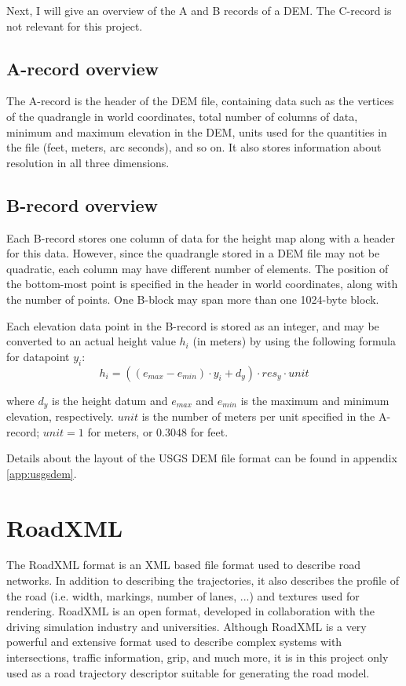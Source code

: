 Next, I will give an overview of the A and B records of a DEM. The C-record is not relevant for this project.

\subsection{A-record overview}
The A-record is the header of the DEM file, containing data such as the vertices of the quadrangle in world coordinates, total number of columns of data, minimum and maximum elevation in the DEM, units used for the quantities in the file (feet, meters, arc seconds), and so on. It also stores information about resolution in all three dimensions. 

\subsection{B-record overview}
\label{sec:back_brecord}
Each B-record stores one column of data for the height map along with a header for this data. However, since the quadrangle stored in a DEM file may not be quadratic, each column may have different number of elements. The position of the bottom-most point is specified in the header in world coordinates, along with the number of points. One B-block may span more than one 1024-byte block.

Each elevation data point in the B-record is stored as an integer, and may be converted to an actual height value $h_i$ (in meters) by using the following formula for datapoint $y_i$:
$$
h_i = ((e_{max}-e_{min})\cdot y_i+ d_y)\cdot res_y \cdot unit
$$

where $d_y$ is the height datum and $e_{max}$ and $e_{min}$ is the maximum and minimum elevation, respectively. $unit$ is the number of meters per unit specified in the A-record; $unit=1$ for meters, or $0.3048$ for feet.

Details about the layout of the USGS DEM file format can be found in appendix \ref{app:usgsdem}.

\section{RoadXML}
The RoadXML format is an XML based file format used to describe road networks. In addition to describing the trajectories, it also describes the profile of the road (i.e. width, markings, number of lanes, ...) and textures used for rendering.\cite{roadxml} RoadXML is an open format, developed in collaboration with the driving simulation industry and universities. Although RoadXML is a very powerful and extensive format used to describe complex systems with intersections, traffic information, grip, and much more, it is in this project only used as a road trajectory descriptor suitable for generating the road model.


